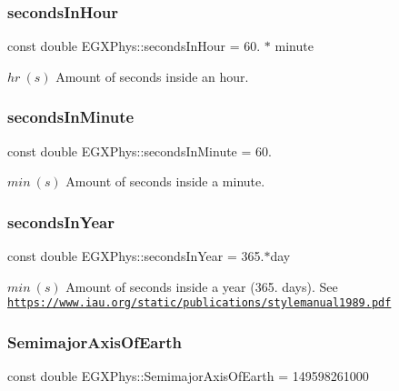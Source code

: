 \subsubsection{\texorpdfstring{seconds\+In\+Hour}{secondsInHour}}
{\footnotesize\ttfamily const double E\+G\+X\+Phys\+::seconds\+In\+Hour = 60. $\ast$ minute}

$hr\ (s)$ Amount of seconds inside an hour. \mbox{\label{namespace_e_g_x_phys_a65038e0b58235dc59a44cec16638df35}} 
\subsubsection{\texorpdfstring{seconds\+In\+Minute}{secondsInMinute}}
{\footnotesize\ttfamily const double E\+G\+X\+Phys\+::seconds\+In\+Minute = 60.}

$min\ (s)$ Amount of seconds inside a minute. \mbox{\label{namespace_e_g_x_phys_aac13efe8296819409bde4a0a8691d56a}} 
\subsubsection{\texorpdfstring{seconds\+In\+Year}{secondsInYear}}
{\footnotesize\ttfamily const double E\+G\+X\+Phys\+::seconds\+In\+Year = 365.$\ast$day}

$min\ (s)$ Amount of seconds inside a year (365. days). See \href{https://www.iau.org/static/publications/stylemanual1989.pdf}{\tt https\+://www.\+iau.\+org/static/publications/stylemanual1989.\+pdf} \mbox{\label{namespace_e_g_x_phys_ad1bdca5cec4a0f4a4b8a18ead61de6d9}} 
\subsubsection{\texorpdfstring{Semimajor\+Axis\+Of\+Earth}{SemimajorAxisOfEarth}}
{\footnotesize\ttfamily const double E\+G\+X\+Phys\+::\+Semimajor\+Axis\+Of\+Earth = 149598261000}

